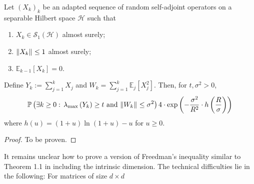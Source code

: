 \begin{thm}
  \label{intfreedman}
    Let \( (X_k)_k \) be an adapted sequence of random self-adjoint operators on a separable Hilbert space \(\mathcal{H}\) such that 
    \begin{enumerate}[1)]
      \item \( X_k \in \mathcal{S}_1(\mathcal{H}) \) almost surely;
      \item \( \norm{X_k}_{} \leq 1 \) almost surely;
      \item \( \mathbb{E}_{k-1}\left[X_k\right]=0 \).
    \end{enumerate}
    Define \( Y_k := \sum_{j=1}^{k} X_j \) and \( W_k = \sum_{j=1}^{k} \mathbb{E}_j\left[X_j^{2}\right] \). Then, for \( t, \sigma^{2} > 0\),
    \[ \mathbb{P}\left(\exists k \geq 0:\, \lambda_{\text{max}}\left(Y_k\right) \geq t \text{ and } \norm{W_k}_{} \leq \sigma^{2}\right) 4 \cdot \operatorname{exp}\left(- \frac{\sigma^{2}}{R^{2}}\cdot h\left(\frac{R}{\sigma}\right)\right)\]
    where \( h(u)= (1+u)\operatorname{ln}(1+u)-u \) for \( u \geq 0 \).
\end{thm}

\begin{proof}
    To be proven.
\end{proof}

It remains unclear how to prove a version of Freedman's inequality similar to Theorem 1.1 in \cite{tropp2011freedman} including the intrinsic dimension. The technical difficulties lie in the following: For matrices of size \( d \times d \)
